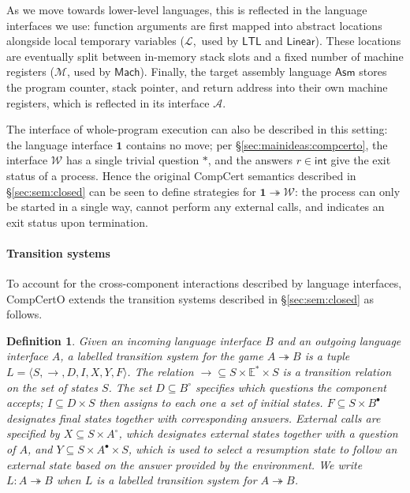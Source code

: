 \documentclass[draft,11pt]{report}
\newtheorem{definition}{Definition}
\newcommand{\kw}[1]{\ensuremath{ \mathsf{#1} }}
\newcommand{\que}{\circ}         %
\newcommand{\ans}{\bullet}       %
\begin{document}
As we move towards lower-level languages,
this is reflected in the language interfaces we use:
function arguments are first mapped into
abstract locations alongside local temporary variables
($\mathcal{L}$,~used by \kw{LTL} and \kw{Linear}).
These locations are eventually split between
in-memory stack slots and a fixed number of machine registers
($\mathcal{M}$, used by \kw{Mach}).
Finally, the target assembly language \kw{Asm}
stores the program counter, stack pointer,
and return address into their own machine registers,
which is reflected in its interface $\mathcal{A}$.

The interface of whole-program execution
can also be described in this setting:
the language interface $\mathbf{1}$ contains no move;
per \S\ref{sec:mainideas:compcerto},
the interface $\mathcal{W}$ has a single trivial question $*$,
and the answers $r \in \kw{int}$
give the exit status of a process.
Hence the original CompCert semantics described in
\S\ref{sec:sem:closed}
can be seen to define strategies for
$\mathbf{1} \twoheadrightarrow \mathcal{W}$:
the process can only be started in a single way,
cannot perform any external calls,
and indicates an exit status upon termination.


\paragraph{Transition systems} %

To account for the cross-component interactions
described by language interfaces,
CompCertO extends
the transition systems described in \S\ref{sec:sem:closed}
as follows.

\begin{definition} \label{def:lts}
Given an \emph{incoming} language interface $B$
and an \emph{outgoing} language interface $A$,
a \emph{labelled transition system for the game $A \twoheadrightarrow B$}
is a tuple $L = \langle S, \rightarrow, D, I, X, Y, F \rangle$.
The relation
${\rightarrow} \subseteq S \times \mathbb{E}^* \times S$ is
a \emph{transition relation} on the set of states $S$.
The set $D \subseteq B^\que$ specifies which
questions the component accepts;
$I \subseteq D \times S$ then
assigns to each one a set of \emph{initial states}.
$F \subseteq S \times B^\ans$
designates \emph{final states} together with corresponding answers.
External calls are specified by
$X \subseteq S \times A^\que$,
which designates \emph{external states} together with
a question of $A$, and
$Y \subseteq S \times A^\ans \times S$,
which is used to select a \emph{resumption state}
to follow an external state
based on the answer provided by the environment.
We write $L : A \twoheadrightarrow B$ when
$L$ is a labelled transition system for $A \twoheadrightarrow B$.
\end{definition}
\end{document}
